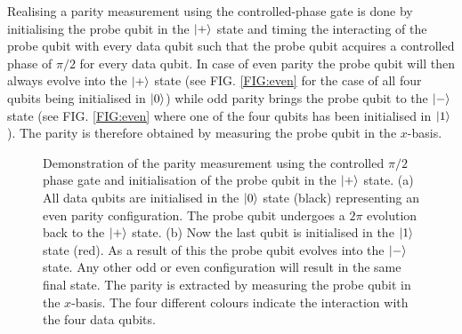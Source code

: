 Realising a parity measurement using the controlled-phase gate is done by initialising the probe qubit in the $\ket{+}$ state and timing the interacting of the probe qubit with every data qubit such that the probe qubit acquires a controlled phase of $\pi/2$ for every data qubit. In case of even parity the probe qubit will then always evolve into the $\ket{+}$ state (see FIG. \ref{FIG:even} for the case of all four qubits being initialised in $\ket{0}$) while odd parity brings the probe qubit to the $\ket{-}$ state (see FIG. \ref{FIG:even} where one of the four qubits has been initialised in $\ket{1}$). The parity is therefore obtained by measuring the probe qubit in the $x$-basis.    


\begin{figure}[H]
	\caption[oddeven]{Demonstration of the parity measurement using the controlled  $\pi/2$ phase gate and initialisation of the probe qubit in the $\ket{+}$ state. (a) All data qubits are initialised in the $\ket{0}$ state (black) representing an even parity configuration. The probe qubit undergoes a $2\pi$ evolution back to  the $\ket{+}$ state. (b) Now the last qubit is initialised in the $\ket{1}$ state (red). As a result of this the probe qubit evolves into the $\ket{-}$ state. Any other odd or even configuration will result in the same final state. The parity is extracted by measuring the probe qubit in the $x$-basis. The four different colours indicate the interaction with the four data qubits.}
	\label{FIG:evolution}
\end{figure}


